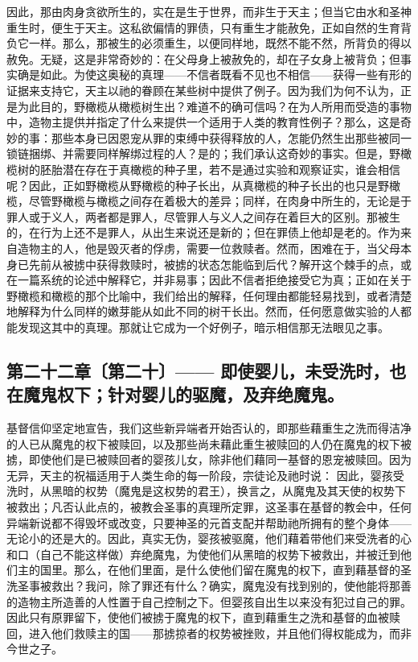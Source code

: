 因此，那由肉身贪欲所生的，实在是生于世界，而非生于天主；但当它由水和圣神重生时，便生于天主。这私欲偏情的罪债，只有重生才能赦免，正如自然的生育背负它一样。那么，那被生的必须重生，以便同样地，既然不能不然，所背负的得以赦免。无疑，这是非常奇妙的：在父母身上被赦免的，却在子女身上被背负；但事实确是如此。为使这奥秘的真理——不信者既看不见也不相信——获得一些有形的证据来支持它，天主以祂的眷顾在某些树中提供了例子。因为我们为何不认为，正是为此目的，野橄榄从橄榄树生出？难道不的确可信吗？在为人所用而受造的事物中，造物主提供并指定了什么来提供一个适用于人类的教育性例子？那么，这是奇妙的事：那些本身已因恩宠从罪的束缚中获得释放的人，怎能仍然生出那些被同一锁链捆绑、并需要同样解绑过程的人？是的；我们承认这奇妙的事实。但是，野橄榄树的胚胎潜在存在于真橄榄的种子里，若不是通过实验和观察证实，谁会相信呢？因此，正如野橄榄从野橄榄的种子长出，从真橄榄的种子长出的也只是野橄榄，尽管野橄榄与橄榄之间存在着极大的差异；同样，在肉身中所生的，无论是于罪人或于义人，两者都是罪人，尽管罪人与义人之间存在着巨大的区别。那被生的，在行为上还不是罪人，从出生来说还是新的；但在罪债上他却是老的。作为来自造物主的人，他是毁灭者的俘虏，需要一位救赎者。然而，困难在于，当父母本身已先前从被掳中获得救赎时，被掳的状态怎能临到后代？解开这个棘手的点，或在一篇系统的论述中解释它，并非易事；因此不信者拒绝接受它为真；正如在关于野橄榄和橄榄的那个比喻中，我们给出的解释，任何理由都能轻易找到，或者清楚地解释为什么同样的嫩芽能从如此不同的树干长出。然而，任何愿意做实验的人都能发现这其中的真理。那就让它成为一个好例子，暗示相信那无法眼见之事。\par


\subsection{第二十二章〔第二十〕—— 即使婴儿，未受洗时，也在魔鬼权下；针对婴儿的驱魔，及弃绝魔鬼。}

基督信仰坚定地宣告，我们这些新异端者开始否认的，即那些藉重生之洗而得洁净的人已从魔鬼的权下被赎回，以及那些尚未藉此重生被赎回的人仍在魔鬼的权下被掳，即使他们是已被赎回者的婴孩儿女，除非他们藉同一基督的恩宠被赎回。因为无异，天主的祝福适用于人类生命的每一阶段，宗徒论及祂时说：  因此，婴孩受洗时，从黑暗的权势（魔鬼是这权势的君王），换言之，从魔鬼及其天使的权势下被救出；凡否认此点的，被教会圣事的真理所定罪，这圣事在基督的教会中，任何异端新说都不得毁坏或改变，只要神圣的元首支配并帮助祂所拥有的整个身体——无论小的还是大的。因此，真实无伪，婴孩被驱魔，他们藉着带他们来受洗者的心和口（自己不能这样做）弃绝魔鬼，为使他们从黑暗的权势下被救出，并被迁到他们主的国里。那么，在他们里面，是什么使他们留在魔鬼的权下，直到藉基督的圣洗圣事被救出？我问，除了罪还有什么？确实，魔鬼没有找到别的，使他能将那善的造物主所造善的人性置于自己控制之下。但婴孩自出生以来没有犯过自己的罪。因此只有原罪留下，使他们被掳于魔鬼的权下，直到藉重生之洗和基督的血被赎回，进入他们救赎主的国——那掳掠者的权势被挫败，并且他们得权能成为，而非今世之子。 \par

